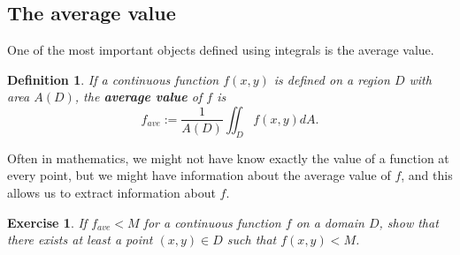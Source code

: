 \documentclass[12pt]{article}
\newtheorem{definition}{Definition}
\newtheorem{exercise}{Exercise}
\begin{document}
\subsection*{The average value}
One of the most important objects defined using integrals is the average value.
\begin{definition} If a continuous function $f(x,y)$ is defined on a region $D$ with area $A(D)$, the \textbf{average value} of $f$ is $$f_{ave}:= \frac{1}{A(D)}  \iint_D f(x,y) dA.$$
\end{definition}
Often in mathematics, we might not have know exactly the value of a function at every point, but we might have information about the average value of $f$, and this allows us to extract information about $f$.

\begin{exercise}
If $f_{ave}< M$ for a continuous function $f$ on a domain $D$, show that there exists at least a point $(x,y)\in D$ such that $f(x,y)<M$.
\end{exercise}
\end{document}
